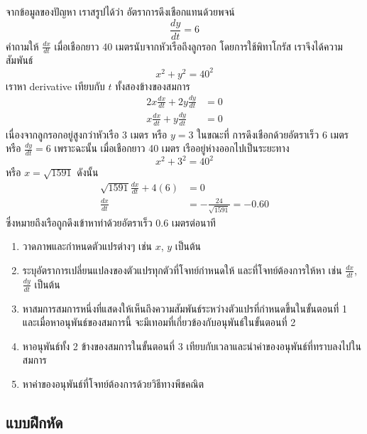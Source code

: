 \documentclass[
]{book}
\begin{document}
จากข้อมูลของปัญหา เราสรูปได้ว่า อัตราการดึงเชือกแทนด้วยพจน์ \[\frac{dy}{dt} = 6\]
คำถามให้ \(\frac{dx}{dt}\) เมื่อเชือกยาว 40 เมตรนับจากหัวเรือถึงลูกรอก
โดยการใช้พิทาโกรัส เราจึงได้ความสัมพันธ์ \[x^2+y^2 = 40^2\] เราหา derivative
เทียบกับ \(t\) ทั้งสองข้างของสมการ \begin{equation}   \begin{aligned}
    2x \frac{dx}{dt} + 2y\frac{dy}{dt} &= 0 \\
    x \frac{dx}{dt} + y\frac{dy}{dt} &= 0
  \end{aligned} \end{equation} เนื่องจากลูกรอกอยู่สูงกว่าหัวเรือ 3 เมตร หรือ
\(y=3\) ในขณะที่ การดึงเชือกด้วยอัตราเร็ว 6 เมตร หรือ \(\frac{dy}{dt} = 6\)
เพราะฉะนั้น เมื่อเชือกยาว 40 เมตร เรืออยู่ห่างออกไปเป็นระยะทาง
\[x^2 + 3^2 = 40^2\] หรือ \(x = \sqrt{1591}\) ดังนั้น
\begin{equation}   \begin{aligned}
    \sqrt{1591}\frac{dx}{dt} + 4(6) &= 0 \\
    \frac{dx}{dt} &= -\frac{24}{\sqrt{1591}} = -0.60
  \end{aligned} \end{equation} ซึ่งหมายถึงเรือถูกดึงเข้าหาท่าด้วยอัตราเร็ว 0.6
เมตรต่อนาที

\begin{enumerate}
\def\labelenumi{\arabic{enumi}.}
\item
  วาดภาพและกำหนดตัวแปรต่างๆ เช่น \(x\), \(y\) เป็นต้น
\item
  ระบุอัตราการเปลี่ยนแปลงของตัวแปรทุกตัวที่โจทย์กำหนดให้ และที่โจทย์ต้องการให้หา เช่น
  \(\displaystyle\frac{dx}{dt}\), \(\displaystyle\frac{dy}{dt}\) เป็นต้น
\item
  หาสมการสมการหนึ่งที่แสดงให้เห็นถึงความสัมพันธ์ระหว่างตัวแปรที่กำหนดขึ้นในขั้นตอนที่ 1
  และเมื่อหาอนุพันธ์ของสมการนี้ จะมีเทอมที่เกี่ยวข้องกับอนุพันธ์ในขั้นตอนที่ 2
\item
  หาอนุพันธ์ทั้ง 2 ข้างของสมการในขั้นตอนที่ 3
  เทียบกับเวลาและนำค่าของอนุพันธ์ที่ทราบลงไปในสมการ
\item
  หาค่าของอนุพันธ์ที่โจทย์ต้องการด้วยวิธีทางพีชคณิต
\end{enumerate}

\subsection{แบบฝึกหัด}\label{uxe41uxe1auxe1auxe1duxe01uxe2buxe14-2}
\end{document}
